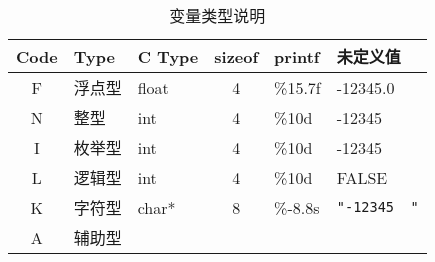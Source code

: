 \begin{table}[H]
\caption{变量类型说明}
\label{table:header-variables-type}
\centering
\ttfamily
\small
\begin{tabular}{cllcll}
	\toprule
    Code    &	Type        &   C Type & sizeof &   printf	&   未定义值        \\
	\midrule
    F		&	浮点型		&   float  &  4     &	\%15.7f &   -12345.0        \\
    N		&	整型		&   int    &  4     &	\%10d   &   -12345        \\
    I		&	枚举型		&   int    &  4     &	\%10d   &   -12345	        \\
    L		&	逻辑型		&   int    &  4     &	\%10d   &   FALSE        \\
    K		&	字符型		&   char*  &  8     &	\%-8.8s & \lstinline[showspaces=true]{"-12345  "}     \\
    A		&	辅助型		&          &        &			& 	    \\
	\bottomrule
\end{tabular}
\end{table}
